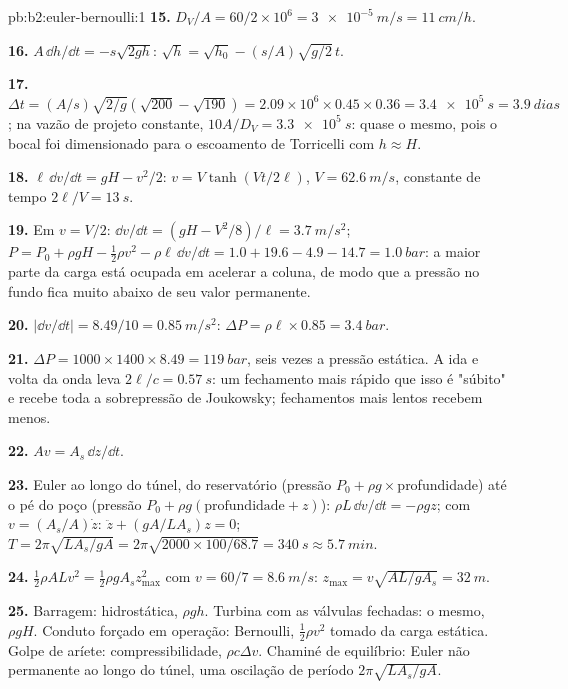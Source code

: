 \begin{solution}{pb:b2:euler-bernoulli:1}
\textbf{15.} $D_V/A = 60/2 \times 10^6 = \qty{3e-5}{m/s} = \qty{11}{cm/h}$.

\textbf{16.} $A\,\dd h/\dd t = -s\sqrt{2gh}$: $\sqrt h = \sqrt{h_0} - (s/A)\sqrt{g/2}\,t$.

\textbf{17.} $\Delta t = (A/s)\sqrt{2/g}(\sqrt{200} - \sqrt{190}) = 2.09 \times 10^6 \times
0.45 \times 0.36 = \qty{3.4e5}{s} = \qty{3.9}{dias}$; na vazão de projeto constante,
$10A/D_V = \qty{3.3e5}{s}$: quase o mesmo, pois o bocal foi dimensionado
para o escoamento de Torricelli com $h \approx H$.

\textbf{18.} $\ell\,\dd v/\dd t = gH - v^2/2$: $v = V\tanh(Vt/2\ell)$, $V = \qty{62.6}{m/s}$,
constante de tempo $2\ell/V = \qty{13}{s}$.

\textbf{19.} Em $v = V/2$: $\dd v/\dd t = (gH - V^2/8)/\ell = \qty{3.7}{m/s^2}$;
$P = P_0 + \rho gH - \tfrac12\rho v^2 - \rho\ell\,\dd v/\dd t = 1.0 + 19.6 - 4.9 - 14.7
= \qty{1.0}{bar}$: a maior parte da carga está ocupada em acelerar a coluna, de modo que
a pressão no fundo fica muito abaixo de seu valor permanente.

\textbf{20.} $|\dd v/\dd t| = 8.49/10 = \qty{0.85}{m/s^2}$: $\Delta P = \rho\ell \times 0.85 =
\qty{3.4}{bar}$.

\textbf{21.} $\Delta P = 1000 \times 1400 \times 8.49 = \qty{119}{bar}$, seis vezes a
pressão estática. A ida e volta da onda leva $2\ell/c = \qty{0.57}{s}$: um
fechamento mais rápido que isso é "súbito" e recebe toda a sobrepressão
de Joukowsky; fechamentos mais lentos recebem menos.

\textbf{22.} $Av = A_s\,\dd z/\dd t$.

\textbf{23.} Euler ao longo do túnel, do reservatório (pressão
$P_0 + \rho g\times$profundidade) até o pé do poço (pressão $P_0 + \rho g
(\text{profundidade} + z)$): $\rho L\,\dd v/\dd t = -\rho gz$; com $v = (A_s/A)\dot z$:
$\ddot z + (gA/LA_s)z = 0$; $T = 2\pi\sqrt{LA_s/gA} = 2\pi\sqrt{2000 \times 100/
68.7} = \qty{340}{s} \approx \qty{5.7}{min}$.

\textbf{24.} $\tfrac12\rho ALv^2 = \tfrac12\rho gA_sz_{\max}^2$ com $v = 60/7 =
\qty{8.6}{m/s}$: $z_{\max} = v\sqrt{AL/gA_s} = \qty{32}{m}$.

\textbf{25.} Barragem: hidrostática, $\rho gh$. Turbina com as válvulas fechadas: o
mesmo, $\rho gH$. Conduto forçado em operação: Bernoulli, $\tfrac12\rho v^2$ tomado
da carga estática. Golpe de aríete: compressibilidade, $\rho c\Delta v$.
Chaminé de equilíbrio: Euler não permanente ao longo do túnel, uma oscilação de período
$2\pi\sqrt{LA_s/gA}$.
\end{solution}
